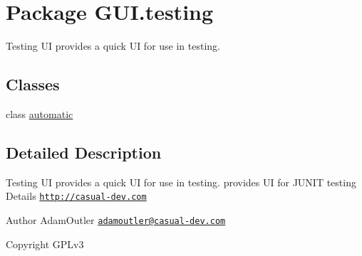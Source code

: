 \hypertarget{namespace_g_u_i_1_1testing}{\section{Package G\-U\-I.\-testing}
\label{namespace_g_u_i_1_1testing}
}


Testing U\-I provides a quick U\-I for use in testing.  


\subsection*{Classes}
\begin{DoxyCompactItemize}
\item 
class \hyperlink{class_g_u_i_1_1testing_1_1automatic}{automatic}
\end{DoxyCompactItemize}


\subsection{Detailed Description}
Testing U\-I provides a quick U\-I for use in testing. provides U\-I for J\-U\-N\-I\-T testing Details \href{http://casual-dev.com}{\tt http\-://casual-\/dev.\-com} \begin{DoxyAuthor}{Author}
Adam\-Outler \href{mailto:adamoutler@casual-dev.com}{\tt adamoutler@casual-\/dev.\-com} 
\end{DoxyAuthor}
\begin{DoxyCopyright}{Copyright}
G\-P\-Lv3 
\end{DoxyCopyright}

